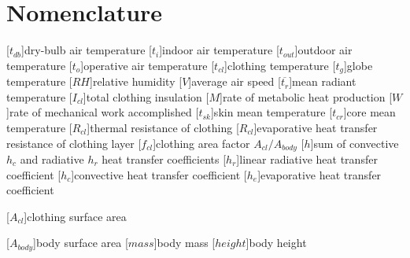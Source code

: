 
\section*{Nomenclature}
\renewcommand{\baselinestretch}{0.75}\normalsize
\begin{acronym}[longest]

    [$t_{db}$]{dry-bulb air temperature}
    [$t_{i}$]{indoor air temperature}
    [$t_{out}$]{outdoor air temperature}
    [$t_{o}$]{operative air temperature}
    [$t_{cl}$]{clothing temperature}
    [$t_{g}$]{globe temperature}
    [$RH$]{relative humidity\acroextra{, \%}}
    [$V$]{average air speed}
    [$\overline{t_{r}}$]{mean radiant temperature}
    [$I_{cl}$]{total clothing insulation}
    [$M$]{rate of metabolic heat production}
    [$W$]{rate of mechanical work accomplished}
    [$t_{sk}$]{skin mean temperature}
    [$t_{cr}$]{core mean temperature}
    [$R_{cl}$]{thermal resistance of clothing}
    [$R_{cl}$]{evaporative heat transfer resistance of clothing layer}
    [$f_{cl}$]{clothing area factor $A_{cl}/A_{body}$}
    [$h$]{sum of convective $h_{c}$ and radiative $h_{r}$ heat transfer coefficients}
    [$h_{r}$]{linear radiative heat transfer coefficient}
    [$h_{c}$]{convective heat transfer coefficient}
    [$h_{e}$]{evaporative heat transfer coefficient}

    [$A_{cl}$]{clothing surface area}

    [$A_{body}$]{body surface area}
    [$mass$]{body mass}
    [$height$]{body height}


\end{acronym}

